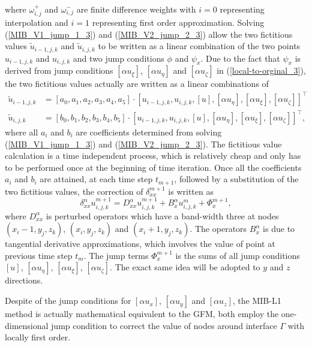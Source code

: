\documentclass[dissertation]{uathesis}
\begin{document}
\begin{body}
\begin{align}
\end{align}
%
where $\omega^{+}_{i,j}$ and $\omega^{-}_{i,j}$ are finite difference weights \cite{fornberg1998classroom} with $i=0$ representing interpolation and $i=1$ representing first order approximation. Solving (\ref{MIB_V1_jump_1_3}) and (\ref{MIB_V2_jump_2_3}) allow the two fictitious values $\tilde u_{i-1,j,k}$ and $\tilde u_{i,j,k}$ to be written as a linear combination of the two points $u_{i-1,j,k}$ and $u_{i,j,k}$ and two jump conditions $\phi$ and $\psi_x$. Due to the fact that $\psi_x$ is derived from jump conditions $[\alpha u_\xi]$, $[\alpha u_\eta]$ and $[\alpha u_\zeta]$ in (\ref{local-to-orginal_3}), the two fictitious values actually are written as a linear combinations of 
%
\begin{align}
\label{linear-combination-1_3}
\tilde{u}_{i-1,j,k} &= [a_0, a_1, a_2, a_3, a_4, a_5] \cdot [u_{i-1,j,k}, u_{i,j,k}, [u], [\alpha u_\eta], [\alpha u_\xi], [\alpha u_\zeta]]^{\intercal} \\
\label{linear-combination-2_3} 
\tilde{u}_{i,j,k} &= [b_0, b_1, b_2, b_3, b_4, b_5] \cdot [u_{i-1,j,k}, u_{i,j,k}, [u], [\alpha u_\eta], [\alpha u_\xi], [\alpha u_\zeta]]^{\intercal},
\end{align}
%
where all $a_i$ and $b_i$ are coefficients determined from solving (\ref{MIB_V1_jump_1_3}) and (\ref{MIB_V2_jump_2_3}). The fictitious value calculation is a time independent process, which is relatively cheap and only has to be performed once at the beginning of time iteration. Once all the coefficients $a_i$ and $b_i$ are attained, at each time step $t_{m+1}$, followed by a substitution of the two fictitious values, the correction of $\delta^{m+1}_{xx}$ is written as 
%
\begin{equation} 
\delta^{\alpha}_{xx} u^{m+1}_{i,j,k} = D^{\alpha}_{xx} u^{m+1}_{i,j,k} + B^{\alpha}_{x} u^{m}_{i,j,k} + \Phi_{x}^{m+1}, \label{delta_xx_operator_3}
\end{equation}
%
where $D^{\alpha}_{xx}$ is perturbed operators which have a band-width three at nodes $(x_i-1, y_j, z_k)$, $(x_i, y_j, z_k)$ and $(x_i+1, y_j, z_k)$. The operators $B^{\alpha}_{x}$ is due to tangential derivative approximations, which involves the value of point at previous time step $t_m$. The jump terms $\Phi^{m+1}_{x}$ is the sums of all jump conditions $[u]$, $[\alpha u_\eta]$, $[\alpha u_\xi]$, $[\alpha u_\zeta]$. The exact same idea will be adopted to $y$ and $z$ directions.

Despite of the jump conditions for $[\alpha u_x]$, $[\alpha u_y]$ and $[\alpha u_z]$, the MIB-L1 method is actually mathematical equivalent to the GFM, both employ the one-dimensional jump condition to correct the value of nodes around interface $\Gamma$ with locally first order. 


\end{body}
\end{document}

